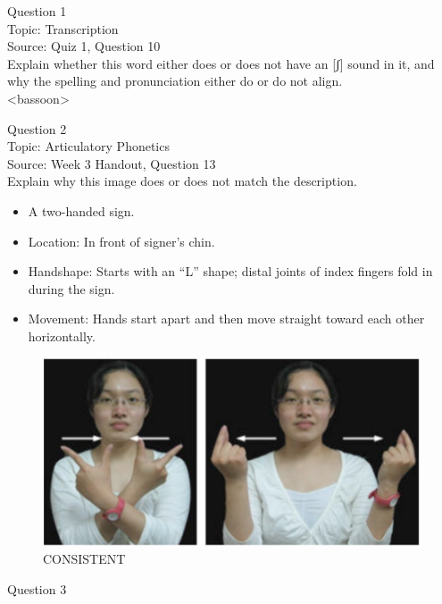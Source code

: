 \documentclass[12pt]{article}
\begin{document}
{\large Question 1}\\

Topic: Transcription\\
Source: Quiz 1, Question 10\\

Explain whether this word either does or does not have an [ʃ] sound in it, and why the spelling and pronunciation either do or do not align.\\

<bassoon>


\newpage

{\large Question 2}\\

Topic: Articulatory Phonetics\\
Source: Week 3 Handout, Question 13\\

Explain why this image does or does not match the description.\\

\begin{itemize} \item A two-handed sign. \item Location: In front of signer’s chin. \item Handshape: Starts with an “L” shape; distal joints of index fingers fold in during the sign. \item Movement: Hands start apart and then move straight toward each other horizontally. \end{itemize}

\begin{figure}[H]
\includegraphics{../images/taiwansign_consistent.png}
\caption{CONSISTENT}
\end{figure}

\newpage

{\large Question 3}\\
\end{document}
